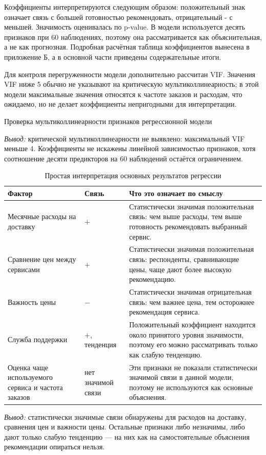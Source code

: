 \documentclass[14pt,a4paper]{extarticle}
\renewcommand{\arraystretch}{1.28}
\newcommand{\miniresult}[1]{%
    \par\vspace{0.30\baselineskip}%
    \noindent\textit{Вывод:} #1%
    \par\vspace{0.25\baselineskip}%
}
\begin{document}
Коэффициенты интерпретируются следующим образом: положительный знак означает связь с большей готовностью рекомендовать, отрицательный - с меньшей. Значимость оценивалась по p-value. В модели используется десять признаков при 60 наблюдениях, поэтому она рассматривается как объяснительная, а не как прогнозная. Подробная расчётная таблица коэффициентов вынесена в приложение Б, а в основной части приведены содержательные итоги.

Для контроля перегруженности модели дополнительно рассчитан VIF. Значения VIF ниже 5 обычно не указывают на критическую мультиколлинеарность; в этой модели максимальные значения относятся к частоте заказов и расходам, что ожидаемо, но не делает коэффициенты непригодными для интерпретации.

\begin{table}[H]
\centering
\caption{Проверка мультиколлинеарности признаков регрессионной модели}
\label{tab:vif}

\end{table}
\miniresult{критической мультиколлинеарности не выявлено: максимальный VIF меньше 4. Коэффициенты не искажены линейной зависимостью признаков, хотя соотношение десяти предикторов на 60 наблюдений остаётся ограничением.}

\begin{table}[H]
\centering
\caption{Простая интерпретация основных результатов регрессии}
\label{tab:regression_reader}
{\small
\setlength{\tabcolsep}{3.2pt}
\renewcommand{\arraystretch}{1.18}
\begin{tabular}{L{4.0cm}C{2.2cm}L{8.0cm}}
\toprule
Фактор & Связь & Что это означает по смыслу \\
\midrule
Месячные расходы на доставку & $+$ & Статистически значимая положительная связь: чем выше расходы, тем выше готовность рекомендовать выбранный сервис. \\
Сравнение цен между сервисами & $+$ & Статистически значимая положительная связь: респонденты, сравнивающие цены, чаще дают более высокую рекомендацию. \\
Важность цены & $-$ & Статистически значимая отрицательная связь: чем важнее цена, тем осторожнее рекомендация сервиса. \\
Служба поддержки & $+$, тенденция & Положительный коэффициент находится около принятого уровня значимости, поэтому его можно рассматривать только как слабую тенденцию. \\
Оценка чаще используемого сервиса и частота заказов & нет значимой связи & Эти признаки не показали статистически значимой связи в данной модели, поэтому не используются как основные объяснения. \\
\bottomrule
\end{tabular}}
\end{table}
\miniresult{статистически значимые связи обнаружены для расходов на доставку, сравнения цен и важности цены. Остальные признаки либо незначимы, либо дают только слабую тенденцию — на них как на самостоятельные объяснения рекомендации опираться нельзя.}
\end{document}
